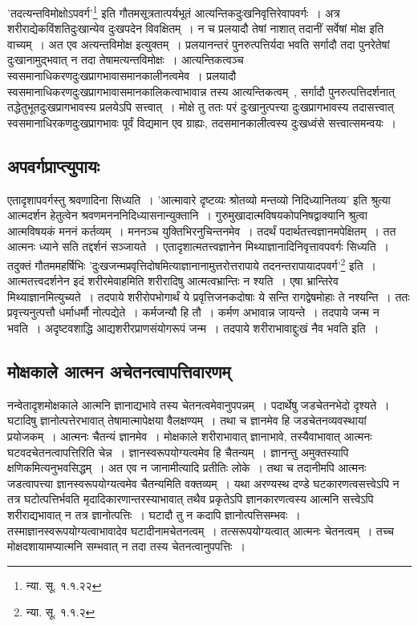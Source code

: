 		'तदत्यन्तविमोक्षोऽपवर्ग'\footnote{न्या. सू. १.१.२२} इति गौतमसूत्रतात्पर्यभूतं आत्यन्तिकदुःखनिवृत्तिरेवापवर्गः~। अत्र शरीराद्येकविंशतिदुःखान्येव दुःखपदेन विवक्षितम्~। न च प्रलयादौ तेषां नाशात् तदानीं सर्वेषां मोक्ष इति वाच्यम्~। अत एव अत्यन्तविमोक्ष इत्युक्तम्~। प्रलयानन्तरं पुनरुत्पत्तिर्यदा भवति सर्गादौ तदा पुनरेतेषां दुःखानामुद्भवात् न तदा तेषामत्यन्तविमोक्षः~। आत्यन्तिकत्वञ्च स्वसमानाधिकरणदुःखप्रागभावासमानकालीनत्वमेव~। प्रलयादौ स्वसमानाधिकरणदुःखप्रागभावासमानकालिकत्वाभावान्न तस्य आत्यन्तिकत्वम्~, सर्गादौ पुनरुत्पत्तिदर्शनात् तद्धेतुभूतदुःखप्रागभावस्य प्रलयेऽपि सत्त्वात्~। मोक्षे तु ततः परं दुःखानुत्पत्त्या दुःखप्रागभावस्य तदासत्त्वात् स्वसमानाधिरकणदुःखप्रागभावः पूर्वं विद्यमान एव ग्राह्यः, तदसमानकालीत्वस्य दुःखध्वंसे सत्त्वात्समन्वयः~।

		\subsection{अपवर्गप्राप्त्युपायः}

		एतादृशापवर्गस्तु श्रवणादिना सिध्यति~। 'आत्मावारे दृष्टव्यः श्रोतव्यो मन्तव्यो निदिध्यानितव्य' इति श्रुत्या आत्मदर्शन हेतुत्वेन श्रवणमनननिदिध्यासनान्युक्तानि~। गुरुमुखादात्मविषयकोपनिषद्वाक्यानि श्रुत्वा आत्मविषयकं मननं कर्तव्यम्~। मननञ्च युक्तिभिरनुचिन्तनमेव~। तदर्थं पदार्थतत्त्वज्ञानमपेक्षितम्~। तत आत्मनः ध्याने सति तद्दर्शनं सञ्जायते~। एतादृशात्मतत्त्वज्ञानेन मिथ्याज्ञानादिनिवृत्तावपवर्गः सिध्यति~। तदुक्तं गौतममहर्षिभिः 'दुःखजन्मप्रवृत्तिदोषमित्याज्ञानानामुत्तरोत्तरापाये तदनन्तरापायादपवर्ग'\footnote{न्या. सू. १.१.२} इति~। आत्मतत्त्वदर्शनेन इदं शरीरमेवाहमिति शरीरादिषु आत्मत्वभ्रान्तिः न श्यति~। एषा भ्रान्तिरेव मिथ्याज्ञानमित्युच्यते~। तदपाये शरीरोपभोगार्थं ये प्रवृत्तिजनकदोषाः ये सन्ति रागद्वेषमोहाः ते नश्यन्ति~। ततः प्रवृत्त्यनुत्पत्तौ धर्माधर्मौ नोत्पद्येते~। कर्मजन्यौ हि तौ~। कर्मण अभावान्न जायन्ते~। तदपाये जन्म न भवति~। अदृष्टवशाद्धि आद्यशरीरप्राणसंयोगरूपं जन्म~। तदपाये शरीराभावाद्दुःखं नैव भवति इति~।

		\subsection{मोक्षकाले आत्मन अचेतनत्वापत्तिवारणम्}

		नन्वेतादृशमोक्षकाले आत्मनि ज्ञानाद्यभावे तस्य चेतनत्वमेवानुपपन्नम्~। पदार्थेषु जडचेतनभेदो दृश्यते~। घटादिषु ज्ञानोत्पत्तेरभावात् तेषामात्मापेक्षया वैलक्षण्यम्~। तथा च ज्ञानमेव हि जडचेतनव्यवस्थायां‌ प्रयोजकम्~। आत्मनः चैतन्यं ज्ञानमेव~। मोक्षकाले शरीराभावात् ज्ञानाभावे, तस्यैवाभावात् आत्मनः घटवदचेतनत्वापत्तिरिति चेन्न~। ज्ञानस्वरूपयोग्यत्वमेव हि चैतन्यम्~। ज्ञानन्तु अमुक्तस्यापि क्षणिकमित्यनुभवसिद्धम्~। अत एव न जानामीत्यादि प्रतीतिः लोके~। तथा च तदानीमपि आत्मनः जडत्वापत्त्या ज्ञानस्वरूपयोग्यत्वमेव चैतन्यमिति वक्तव्यम्~। यथा अरण्यस्थ दण्डे घटकारणत्वसत्त्वेऽपि न तत्र घटोत्पत्तिर्भवति मृदादिकारणान्तरस्याभावात् तथैव प्रकृतेऽपि ज्ञानकारणत्वस्य आत्मनि सत्त्वेऽपि शरीराद्यभावात् न तत्र ज्ञानोत्पत्तिः~। घटादौ तु न कदापि ज्ञानोत्पत्तिसम्भवः~। तस्माज्ञानस्वरूपयोग्यत्वाभावादेव घटादीनामचेतनत्वम्~। तत्सरूपयोग्यत्वात् आत्मनः चेतनत्वम्~। तच्च मोक्षदशायामप्यात्मनि सम्भवात् न तदा तस्य चेतनत्वानुपपत्तिः~।

